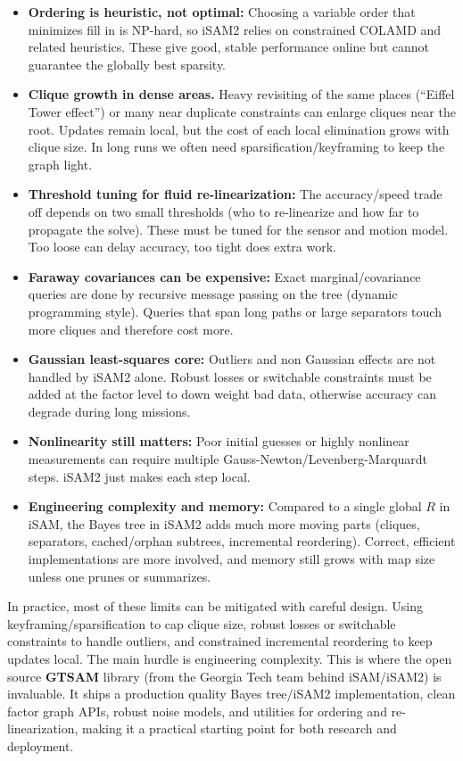 \begin{itemize}
  \item \textbf{Ordering is heuristic, not optimal:} Choosing a variable order that minimizes fill in is NP-hard, so \gls{iSAM}2 relies on constrained \gls{COLAMD} and related heuristics. These give good, stable performance online but cannot guarantee the globally best sparsity.

  \item \textbf{Clique growth in dense areas.} Heavy revisiting of the same places (``Eiffel Tower effect'') or many near duplicate constraints can enlarge cliques near the root. Updates remain local, but the cost of each local elimination grows with clique size. In long runs we often need sparsification/keyframing to keep the graph light.

  \item \textbf{Threshold tuning for fluid re-linearization:} The accuracy/speed trade off depends on two small thresholds (who to re-linearize and how far to propagate the solve). These must be tuned for the sensor and motion model. Too loose can delay accuracy, too tight does extra work.

  \item \textbf{Faraway covariances can be expensive:} Exact marginal/covariance queries are done by recursive message passing on the tree (dynamic programming style). Queries that span long paths or large separators touch more cliques and therefore cost more.

  \item \textbf{Gaussian least-squares core:} Outliers and non Gaussian effects are not handled by \gls{iSAM}2 alone. Robust losses or switchable constraints must be added at the factor level to down weight bad data, otherwise accuracy can degrade during long missions.

  \item \textbf{Nonlinearity still matters:} Poor initial guesses or highly nonlinear measurements can require multiple Gauss-Newton/Levenberg-Marquardt steps. \gls{iSAM}2 just makes each step local.

  \item \textbf{Engineering complexity and memory:} Compared to a single global $R$ in \gls{iSAM}, the Bayes tree in \gls{iSAM}2 adds much more moving parts (cliques, separators, cached/orphan subtrees, incremental reordering). Correct, efficient implementations are more involved, and memory still grows with map size unless one prunes or summarizes.
\end{itemize}
\noindent 
In practice, most of these limits can be mitigated with careful design. Using keyframing/sparsification to cap clique size, robust losses or switchable constraints to handle outliers, and constrained incremental reordering to keep updates local. The main hurdle is engineering complexity. This is where the open source \textbf{\gls{GTSAM}} library (from the Georgia Tech team behind \gls{iSAM}/\gls{iSAM}2) is invaluable. It ships a production quality Bayes tree/\gls{iSAM}2 implementation, clean factor graph APIs, robust noise models, and utilities for ordering and re-linearization, making it a practical starting point for both research and deployment.

